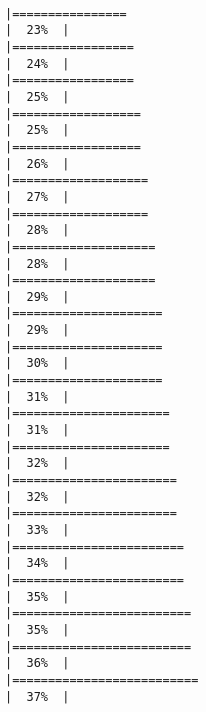 \documentclass[12pt,twoside]{reedthesis}
\begin{document}
\begin{verbatim}
                                                                           |================                                                      |  23%  |                                                                              |=================                                                     |  24%  |                                                                              |=================                                                     |  25%  |                                                                              |==================                                                    |  25%  |                                                                              |==================                                                    |  26%  |                                                                              |===================                                                   |  27%  |                                                                              |===================                                                   |  28%  |                                                                              |====================                                                  |  28%  |                                                                              |====================                                                  |  29%  |                                                                              |=====================                                                 |  29%  |                                                                              |=====================                                                 |  30%  |                                                                              |=====================                                                 |  31%  |                                                                              |======================                                                |  31%  |                                                                              |======================                                                |  32%  |                                                                              |=======================                                               |  32%  |                                                                              |=======================                                               |  33%  |                                                                              |========================                                              |  34%  |                                                                              |========================                                              |  35%  |                                                                              |=========================                                             |  35%  |                                                                              |=========================                                             |  36%  |                                                                              |==========================                                            |  37%  |    
\end{verbatim}
\end{document}
